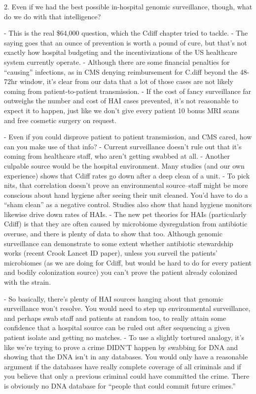 2. Even if we had the best possible in-hospital genomic surveillance, though, what do we do with that intelligence?

- This is the real \$64,000 question, which the Cdiff chapter tried to tackle.
  - The saying goes that an ounce of prevention is worth a pound of cure, but that's not exactly how hospital budgeting and the incentivizations of the US healthcare system currently operate.
  - Although there are some financial penalties for ``causing'' infections, as in CMS denying reimbursement for C.diff beyond the 48-72hr window, it's clear from our data that a lot of those cases are not likely coming from patient-to-patient transmission.
  - If the cost of fancy surveillance far outweighs the number and cost of HAI cases prevented, it's not reasonable to expect it to happen, just like we don't give every patient 10 bonus MRI scans and free cosmetic surgery on request.
  
- Even if you could disprove patient to patient transmission, and CMS cared, how can you make use of that info?
  - Current surveillance doesn't rule out that it's coming from healthcare staff, who aren't getting swabbed at all.
  - Another culpable source would be the hospital environment. Many studies (and our own experience) shows that Cdiff rates go down after a deep clean of a unit.
    - To pick nits, that correlation doesn't prove an environmental source--staff might be more conscious about hand hygiene after seeing their unit cleaned. You'd have to do a ``sham clean'' as a negative control. Studies also show that hand hygiene monitors likewise drive down rates of HAIs.
  - The new pet theories for HAIs (particularly Cdiff) is that they are often caused by microbiome dysregulation from antibiotic overuse, and there is plenty of data to show that too. Although genomic surveillance can demonstrate to some extent whether antibiotic stewardship works (recent Crook Lancet ID paper), unless you surveil the patients' microbiomes (as we are doing for Cdiff, but would be hard to do for every patient and bodily colonization source) you can't prove the patient already colonized with the strain.

- So basically, there's plenty of HAI sources hanging about that genomic surveillance won't resolve. You would need to step up environmental surveillance, and perhaps swab staff and patients at random too, to really attain some confidence that a hospital source can be ruled out after sequencing a given patient isolate and getting no matches.
  - To use a slightly tortured analogy, it's like we're trying to prove a crime DIDN'T happen by swabbing for DNA and showing that the DNA isn't in any databases. You would only have a reasonable argument if the databases have really complete coverage of all criminals and if you believe that only a previous criminal could have committed the crime. There is obviously no DNA database for ``people that could commit future crimes.''

